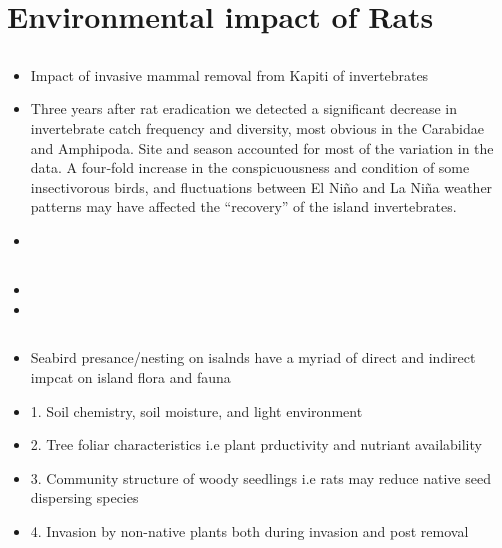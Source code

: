\documentclass[document.tex]{subfiles}
\begin{document}
\section{Environmental impact of Rats}

    \subsection{}
    \begin{itemize}
    \item Impact of invasive mammal removal from Kapiti of invertebrates
    \item Three years after rat eradication we detected a significant decrease in invertebrate catch frequency and diversity, most obvious in the Carabidae and Amphipoda. Site and season accounted for most of the variation in the data. A four‐fold increase in the conspicuousness and condition of some insectivorous birds, and fluctuations between El Niño and La Niña weather patterns may have affected the “recovery” of the island invertebrates. 
    \item 
    \end{itemize}


    \subsection{}
    \begin{itemize}
    \item 
    \item 
    \end{itemize}


    \subsection{}
    \begin{itemize}
    \item Seabird presance/nesting on isalnds have a myriad of direct and indirect impcat on island flora and fauna 
    \item 1. Soil chemistry, soil moisture, and light environment
    \item 2. Tree foliar characteristics i.e plant prductivity and nutriant availability
    \item 3. Community structure of woody seedlings i.e rats may reduce native seed dispersing species
    \item 4. Invasion by non-native plants both during invasion and post removal
    \end{itemize}
\end{document}
